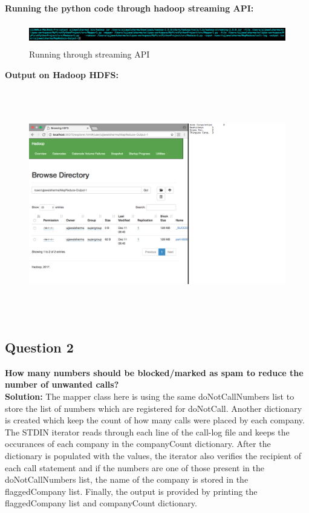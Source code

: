 \documentclass[a4paper, 10pt]{article}
\begin{document}
\noindent
\textbf{Running the python code through hadoop streaming API:}
\begin{figure}[!htbp]
    \centering
    \includegraphics[height=1cm]{Run1.png}
    \caption{Running through streaming API}
\end{figure}

\noindent
\textbf{Output on Hadoop HDFS:}
\begin{figure}[!htbp]
    \centering
    \includegraphics[height=10cm]{Hadoop1.png}
\end{figure}

\subsection{Question 2}
\textbf{How many numbers should be blocked/marked as spam to reduce the number of unwanted calls?}\\
\noindent
\textbf{Solution:}
The mapper class here is using the same doNotCallNumbers list to store the list of numbers which are registered for doNotCall. Another dictionary is created which keep the count of how many calls were placed by each company. The STDIN iterator reads through each line of the call-log file and keeps the occurances of each company in the companyCount dictionary. After the dictionary is populated with the values, the iterator also verifies the recipient of each call statement and if the numbers are one of those present in the doNotCallNumbers list, the name of the company is stored in the flaggedCompany list. Finally, the output is provided by printing the flaggedCompany list and companyCount dictionary.
\end{document}
